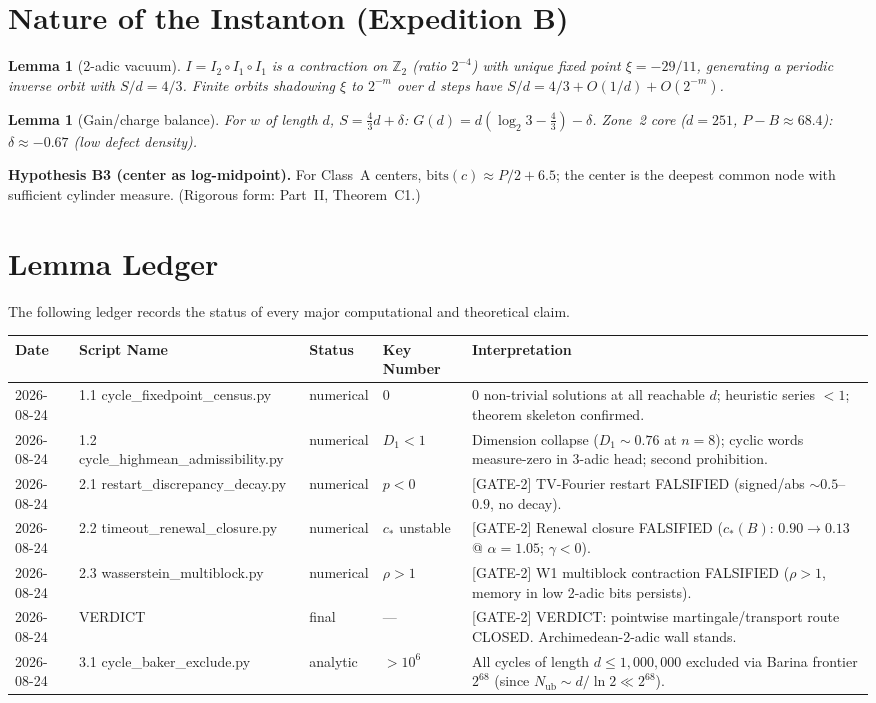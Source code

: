 \documentclass[12pt,a4paper]{article}
\newtheorem{lemma}[theorem]{Lemma}
\theoremstyle{remark}
\begin{document}
\section{Nature of the Instanton (Expedition B)}
\begin{lemma}[2-adic vacuum]
$I=I_2\circ I_1\circ I_1$ is a contraction on $\mathbb Z_2$ (ratio $2^{-4}$) with unique fixed point $\xi=-29/11$, generating a periodic inverse orbit with $S/d=4/3$. Finite orbits shadowing $\xi$ to $2^{-m}$ over $d$ steps have $S/d=4/3+O(1/d)+O(2^{-m})$.
\end{lemma}
\begin{lemma}[Gain/charge balance]
For $w$ of length $d$, $S=\tfrac43 d+\delta$: $G(d)=d(\log_2 3-\tfrac43)-\delta$. Zone~2 core ($d=251$, $P-B\approx68.4$): $\delta\approx-0.67$ (low defect density).
\end{lemma}
\textbf{Hypothesis B3 (center as log-midpoint).} For Class~A centers, $\mathrm{bits}(c)\approx P/2+6.5$; the center is the deepest common node with sufficient cylinder measure. (Rigorous form: Part~II, Theorem~C1.)

\section{Lemma Ledger}
\label{sec:lemma_ledger}
The following ledger records the status of every major computational and theoretical claim.
\begin{longtable}{lllll}
\toprule
\textbf{Date} & \textbf{Script Name} & \textbf{Status} & \textbf{Key Number} & \textbf{Interpretation} \\
\midrule
2026-08-24 & 1.1 cycle\_fixedpoint\_census.py & numerical & 0 & 0 non-trivial solutions at all reachable $d$; heuristic series $<1$; theorem skeleton confirmed. \\
2026-08-24 & 1.2 cycle\_highmean\_admissibility.py & numerical & $D_1<1$ & Dimension collapse ($D_1\sim0.76$ at $n=8$); cyclic words measure-zero in $3$-adic head; second prohibition. \\
2026-08-24 & 2.1 restart\_discrepancy\_decay.py & numerical & $p<0$ & [GATE-2] TV-Fourier restart FALSIFIED (signed/abs $\sim0.5$--$0.9$, no decay). \\
2026-08-24 & 2.2 timeout\_renewal\_closure.py & numerical & $c_*$ unstable & [GATE-2] Renewal closure FALSIFIED ($c_*(B)$: $0.90\to0.13$ @ $\alpha=1.05$; $\gamma<0$). \\
2026-08-24 & 2.3 wasserstein\_multiblock.py & numerical & $\rho>1$ & [GATE-2] W1 multiblock contraction FALSIFIED ($\rho>1$, memory in low 2-adic bits persists). \\
2026-08-24 & VERDICT & final & --- & [GATE-2] VERDICT: pointwise martingale/transport route CLOSED. Archimedean-2-adic wall stands. \\
2026-08-24 & 3.1 cycle\_baker\_exclude.py & analytic & $>10^6$ & All cycles of length $d\le1{,}000{,}000$ excluded via Barina frontier $2^{68}$ (since $N_{\mathrm{ub}}\sim d/\ln2\ll2^{68}$). \\
\bottomrule
\end{longtable}
\end{document}
